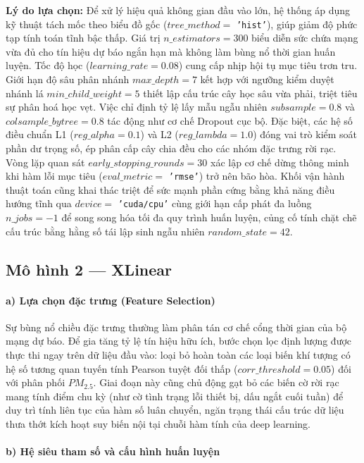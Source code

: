 \textbf{Lý do lựa chọn:} Để xử lý hiệu quả không gian đầu vào lớn, hệ thống áp dụng kỹ thuật tách mốc theo biểu đồ gốc ($tree\_method=$ \texttt{'hist'}), giúp giảm độ phức tạp tính toán tĩnh bậc thấp. Giá trị $n\_estimators=300$ biểu diễn sức chứa mạng vừa đủ cho tín hiệu dự báo ngắn hạn mà không làm bùng nổ thời gian huấn luyện. Tốc độ học ($learning\_rate=0.08$) cung cấp nhịp hội tụ mục tiêu trơn tru. Giới hạn độ sâu phân nhánh $max\_depth=7$ kết hợp với ngưỡng kiểm duyệt nhánh lá $min\_child\_weight=5$ thiết lập cấu trúc cây học sâu vừa phải, triệt tiêu sự phân hoá học vẹt. Việc chỉ định tỷ lệ lấy mẫu ngẫu nhiên $subsample=0.8$ và $colsample\_bytree=0.8$ tác động như cơ chế Dropout cục bộ. Đặc biệt, các hệ số điều chuẩn L1 ($reg\_alpha=0.1$) và L2 ($reg\_lambda=1.0$) đóng vai trò kiểm soát phần dư trọng số, ép phân cấp cây chia đều cho các nhóm đặc trưng rời rạc. Vòng lặp quan sát $early\_stopping\_rounds=30$ xác lập cơ chế dừng thông minh khi hàm lỗi mục tiêu ($eval\_metric=$ \texttt{'rmse'}) trở nên bão hòa. Khối vận hành thuật toán cũng khai thác triệt để sức mạnh phần cứng bằng khả năng điều hướng tĩnh qua $device=$ \texttt{'cuda/cpu'} cùng giới hạn cấp phát đa luồng $n\_jobs=-1$ để song song hóa tối đa quy trình huấn luyện, củng cố tính chặt chẽ cấu trúc bằng hằng số tái lập sinh ngẫu nhiên $random\_state=42$.

\subsection{Mô hình 2 --- XLinear}

\paragraph{a) Lựa chọn đặc trưng (Feature Selection)}

Sự bùng nổ chiều đặc trưng thường làm phân tán cơ chế cổng thời gian  của bộ mạng dự báo. Để gia tăng tỷ lệ tín hiệu hữu ích, bước chọn lọc định lượng được thực thi ngay trên dữ liệu đầu vào: loại bỏ hoàn toàn các loại biến khí tượng có hệ số tương quan tuyến tính Pearson tuyệt đối thấp ($corr\_threshold=0.05$) đối với phân phối $PM_{2.5}$. Giai đoạn này cũng chủ động gạt bỏ các biến cờ rời rạc mang tính điểm chu kỳ (như cờ tình trạng lỗi thiết bị, dấu ngắt cuối tuần) để duy trì tính liên tục của hàm số luân chuyển, ngăn trạng thái cấu trúc dữ liệu thưa thớt kích hoạt suy biến nội tại chuỗi hàm tính của deep learning.

\paragraph{b) Hệ siêu tham số và cấu hình huấn luyện}

